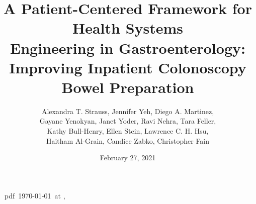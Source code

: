 \documentclass[Bprep]{subfiles}
\providecommand{\versn}{pdf} %
\begin{document}
\ifthenelse{\boolean{Web}}{    %
  \renewcommand{\versn}{Web}     %
  \renewcommand{\rootFromOut}{.} %
}{}  %


\hfill{\tiny \jobname~\versn~\today~{at} \DTMcurrenttime, ~~}

\title{\Large A Patient-Centered Framework for Health Systems\\Engineering in Gastroenterology:\\Improving Inpatient Colonoscopy Bowel Preparation}

\author{Alexandra T. Strauss, Jennifer Yeh, Diego A. Martinez,\\ Gayane Yenokyan, Janet Yoder, Ravi Nehra, Tara Feller,\\Kathy Bull-Henry, Ellen Stein, Lawrence C. H. Hsu\authNum,\\Haitham Al-Grain, Candice Zabko, Christopher Fain}



\renewcommand{\forcedate}{February 27, 2021}\date{\forcedate}
\end{document}
